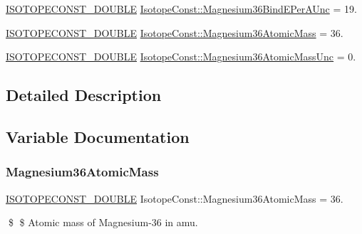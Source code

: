 \begin{DoxyCompactItemize}
\mbox{\hyperlink{group___isotope_const-_macros_ga8f45a7272ce02c0b4c65c44636ed719a}{I\+S\+O\+T\+O\+P\+E\+C\+O\+N\+S\+T\+\_\+\+D\+O\+U\+B\+LE}} \mbox{\hyperlink{group___isotope_const-_magnesium-_mg36_ga9e554540645e87e39ec2f5f8cfb657ea}{Isotope\+Const\+::\+Magnesium36\+Bind\+E\+Per\+A\+Unc}} = 19.
\item 
\mbox{\hyperlink{group___isotope_const-_macros_ga8f45a7272ce02c0b4c65c44636ed719a}{I\+S\+O\+T\+O\+P\+E\+C\+O\+N\+S\+T\+\_\+\+D\+O\+U\+B\+LE}} \mbox{\hyperlink{group___isotope_const-_magnesium-_mg36_gad18886caecf2f04e950d9f3a95e58fe0}{Isotope\+Const\+::\+Magnesium36\+Atomic\+Mass}} = 36.
\item 
\mbox{\hyperlink{group___isotope_const-_macros_ga8f45a7272ce02c0b4c65c44636ed719a}{I\+S\+O\+T\+O\+P\+E\+C\+O\+N\+S\+T\+\_\+\+D\+O\+U\+B\+LE}} \mbox{\hyperlink{group___isotope_const-_magnesium-_mg36_gad4fa10b40f2ac0ab0f591fbccff68147}{Isotope\+Const\+::\+Magnesium36\+Atomic\+Mass\+Unc}} = 0.
\end{DoxyCompactItemize}


\subsection{Detailed Description}


\subsection{Variable Documentation}
\mbox{\label{group___isotope_const-_magnesium-_mg36_gad18886caecf2f04e950d9f3a95e58fe0}} 
\subsubsection{\texorpdfstring{Magnesium36\+Atomic\+Mass}{Magnesium36AtomicMass}}
{\footnotesize\ttfamily \mbox{\hyperlink{group___isotope_const-_macros_ga8f45a7272ce02c0b4c65c44636ed719a}{I\+S\+O\+T\+O\+P\+E\+C\+O\+N\+S\+T\+\_\+\+D\+O\+U\+B\+LE}} Isotope\+Const\+::\+Magnesium36\+Atomic\+Mass = 36.}

\$ \$ Atomic mass of Magnesium-\/36 in amu. \mbox{\label{group___isotope_const-_magnesium-_mg36_gad4fa10b40f2ac0ab0f591fbccff68147}} 
